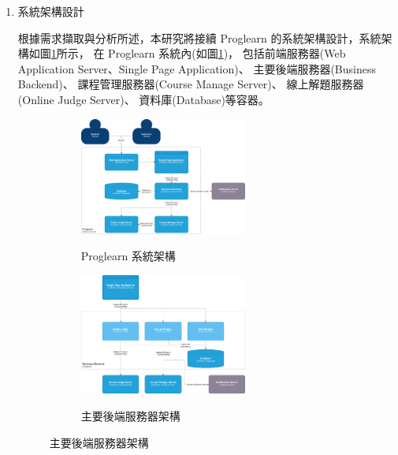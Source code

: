 \documentclass[12pt]{article}
\begin{document}
\begin{enumerate}
\begin{enumerate}
      \item 系統架構設計
        \par 根據需求擷取與分析所述，本研究將接續 Proglearn 的系統架構設計，系統架構如圖\ref{arc1}所示，
        在 Proglearn 系統內(如圖\ref{arc1})，
        包括前端服務器(Web Application Server、Single Page Application)、
        主要後端服務器(Business Backend)、
        課程管理服務器(Course Manage Server)、
        線上解題服務器(Online Judge Server)、
        資料庫(Database)等容器。
        \begin{figure}[htb]
          \centering
          \begin{subfigure}{0.45\linewidth}
            \centering
            \href{https://raw.githubusercontent.com/programingtw/proglearn-plan/main/img/arc1.jpg}{
              \includegraphics[width=0.65\textwidth]{./img/arc1.jpg}
            }
            \caption{Proglearn 系統架構}
            \label{arc1}            
          \end{subfigure}
          \begin{subfigure}{0.45\linewidth}
            \centering
            \href{https://raw.githubusercontent.com/programingtw/proglearn-plan/main/img/arc2.jpg}{
              \includegraphics[width=0.65\textwidth]{./img/arc2.jpg}
            }
            \caption{主要後端服務器架構}
            \label{arc2}
          \end{subfigure}

\end{figure}
\end{enumerate}
\end{enumerate}
\end{document}

